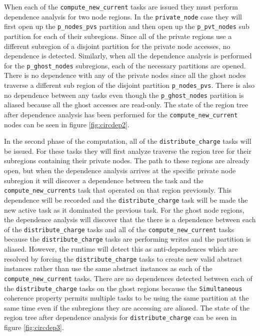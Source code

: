 When each of the {\tt compute\_new\_current} tasks are issued they must perform dependence
analysis for two node regions.  In the {\tt private\_node} case they will first open
up the {\tt p\_nodes\_pvs} partition and then open up the {\tt p\_pvt\_nodes} sub partition
for each of their subregions.  Since all of the private regions use a different subregion
of a disjoint partition for the private node accesses, no dependence is detected.  Similarly,
when all the dependence analysis is performed for the {\tt p\_ghost\_nodes} subregions,
each of the necessary partitions are opened.  There is no dependence with any of the private
nodes since all the ghost nodes traverse a different sub region of the disjoint partition
{\tt p\_nodes\_pvs}.  There is also no dependence between any tasks even though the
{\tt p\_ghost\_nodes} partition is aliased because all the ghost accesses are read-only.
The state of the region tree after dependence analysis has been performed for the
{\tt compute\_new\_current} nodes can be seen in figure \ref{fig:circdep2}.

In the second phase of the computation, all of the {\tt distribute\_charge} tasks
will be issued.  For these tasks they will first analyze traverse the region tree
for their subregions containing their private nodes.  The path to these regions are
already open, but when the dependence analysis arrives at the specific private node subregion it will
discover a dependence between the task and the {\tt compute\_new\_currents} task that operated
on that region previously.  This dependence will be recorded and the 
{\tt distribute\_charge} task will be made the new active task as it dominated the
previous task.  For the ghost node regions, the dependence analysis will discover that the
there is a dependence between each of the {\tt distribute\_charge} tasks and all of the
{\tt compute\_new\_current} tasks because the {\tt distribute\_charge} tasks are
performing writes and the partition is aliased.  However, the runtime will detect this as
anti-dependences which are resolved by forcing the {\tt distribute\_charge} tasks to
create new valid abstract instances rather than use the same abstract instances as
each of the {\tt compute\_new\_current} tasks.  There are no dependences detected
between each of the {\tt distribute\_charge} tasks on the ghost regions because
the {\tt Simultaneous} coherence property permits multiple tasks to be using the same
partition at the same time even if the subregions they are accessing are aliased.  The
state of the region tree after dependence analysis for {\tt distribute\_charge} can
be seen in figure \ref{fig:circdep3}.

